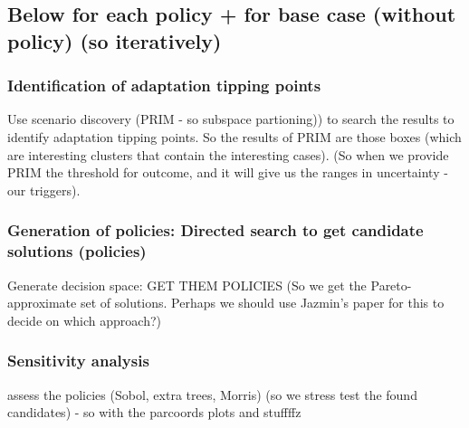 \subsection{Below for each policy + for base case (without policy) (so iteratively)}
\subsubsection{Identification of adaptation tipping points}
Use scenario discovery (PRIM - so subspace partioning)) to search the results to identify adaptation tipping points. So the results of PRIM are those boxes (which are interesting clusters that contain the interesting cases). (So when we provide PRIM the threshold for outcome, and it will give us the ranges in uncertainty - our triggers).


\subsubsection{Generation of policies: Directed search to get candidate solutions (policies)}
Generate decision space: GET THEM POLICIES
(So we get the Pareto-approximate set of solutions. Perhaps we should use Jazmin's paper for this to decide on which approach?)

\subsubsection{Sensitivity analysis}
assess the policies (Sobol, extra trees, Morris) (so we stress test the found candidates) - so with the parcoords plots and stuffffz

